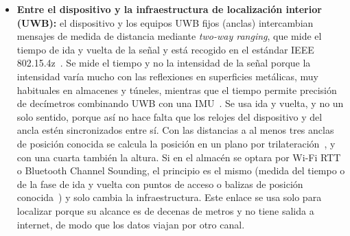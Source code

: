 \documentclass[11pt,a4paper]{article}
\begin{document}
\begin{itemize}
    \item \textbf{Entre el dispositivo y la infraestructura de localización interior (UWB):} el dispositivo y los equipos UWB fijos (anclas) intercambian mensajes de medida de distancia mediante \emph{two-way ranging}, que mide el tiempo de ida y vuelta de la señal y está recogido en el estándar IEEE 802.15.4z~\cite{ref25}. Se mide el tiempo y no la intensidad de la señal porque la intensidad varía mucho con las reflexiones en superficies metálicas, muy habituales en almacenes y túneles, mientras que el tiempo permite precisión de decímetros combinando UWB con una IMU~\cite{ref23}. Se usa ida y vuelta, y no un solo sentido, porque así no hace falta que los relojes del dispositivo y del ancla estén sincronizados entre sí. Con las distancias a al menos tres anclas de posición conocida se calcula la posición en un plano por trilateración~\cite{ref17}, y con una cuarta también la altura. Si en el almacén se optara por Wi-Fi RTT o Bluetooth Channel Sounding, el principio es el mismo (medida del tiempo o de la fase de ida y vuelta con puntos de acceso o balizas de posición conocida~\cite{ref18,ref19}) y solo cambia la infraestructura. Este enlace se usa solo para localizar porque su alcance es de decenas de metros y no tiene salida a internet, de modo que los datos viajan por otro canal.


\end{itemize}
\end{document}
